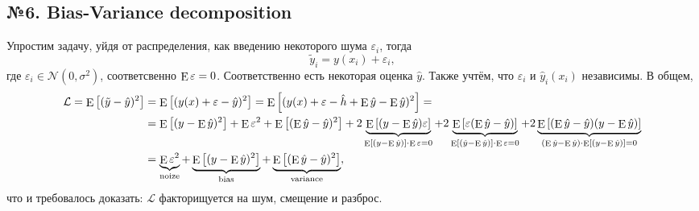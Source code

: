 \subsection*{№6. Bias-Variance decomposition}

Упростим задачу, уйдя от распределения, как введению некоторого шума $\varepsilon_i$, тогда
\begin{equation*}
    \tilde{y}_i = y(x_i) + \varepsilon_i,
\end{equation*}
где $\varepsilon_i \in \mathcal N(0, \sigma^2)$, соответсвенно $\E \varepsilon = 0$. Соответственно есть некоторая оценка $\hat{y}$. Также учтём, что $\varepsilon_i$ и $\hat{y}_i (x_i)$  независимы. В общем, 
\begin{align*}
    \mathcal L = \E\left[
        (\tilde{y} - \hat{y})^2
    \right] &= \E\left[
        (y(x) + \varepsilon - \hat{y})^2
    \right] = 
    \E\left[
        (
            y(x) + \varepsilon - \hat{h} + \E \hat{y} - \E \hat{y}
        )^2
    \right] = \\
    &= \E\left[
        (y - \E \hat{y})^2
    \right] + \E \varepsilon^2 + 
    \E \left[
        (\E \hat{y} - \hat{y})^2
    \right] + 2\underbrace{ \E \left[
        (y - \E \hat{y}) \varepsilon
    \right]}_{\E \left[(y - \E \hat{y})\right] \cdot \E \varepsilon = 0} + 
    2 \underbrace{\E\left[
        \varepsilon (\E \hat{y} - \hat{y})
    \right]}_{\E \left[(\hat{y} - \E \hat{y})\right] \cdot \E \varepsilon = 0} + 
    2 \underbrace{\E \left[
        (\E \hat{y} - \hat{y})(y - \E \hat{y})
    \right]}_{(\E \hat{y} - \E \hat{y}) \cdot \E \left[(y - \E \hat{y})\right]= 0}
    \\
    &= \underbrace{\E \varepsilon^2}_{\text{noize}} + \underbrace{\E \left[
         (y - \E \hat{y})^2
    \right]}_{\text{bias}} + \underbrace{\E \left[
        (\E \hat{y} - \hat{y})^2
    \right]}_{\text{variance}},
\end{align*}
что и требовалось доказать: $\mathcal L$ факторищуется на шум, смещение и разброс. 








